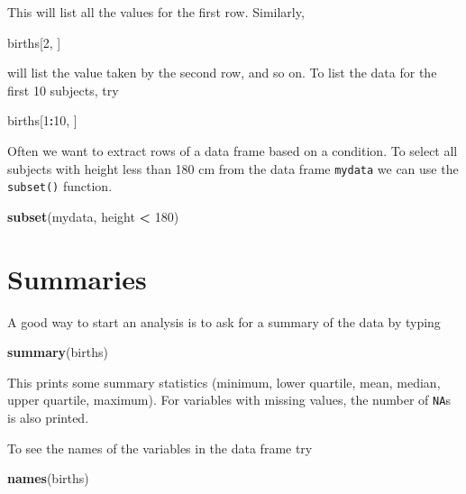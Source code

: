 \documentclass[
]{book}
\newenvironment{Shaded}{\begin{snugshade}}{\end{snugshade}}
\newcommand{\DecValTok}[1]{\textcolor[rgb]{0.00,0.00,0.81}{#1}}
\newcommand{\FunctionTok}[1]{\textcolor[rgb]{0.13,0.29,0.53}{\textbf{#1}}}
\newcommand{\NormalTok}[1]{#1}
\newcommand{\SpecialCharTok}[1]{\textcolor[rgb]{0.81,0.36,0.00}{\textbf{#1}}}
\begin{document}
This will list all the values for the first row. Similarly,

\begin{Shaded}
\begin{Highlighting}[]
\NormalTok{births[}\DecValTok{2}\NormalTok{, ]}
\end{Highlighting}
\end{Shaded}

will list the value taken by the second row, and so on.
To list the data for the first 10 subjects, try

\begin{Shaded}
\begin{Highlighting}[]
\NormalTok{births[}\DecValTok{1}\SpecialCharTok{:}\DecValTok{10}\NormalTok{, ]}
\end{Highlighting}
\end{Shaded}

Often we want to extract rows of a data frame based on a condition.
To select all subjects with height less than 180 cm from the
data frame \texttt{mydata} we can use the \texttt{subset()} function.

\begin{Shaded}
\begin{Highlighting}[]
\FunctionTok{subset}\NormalTok{(mydata, height }\SpecialCharTok{\textless{}} \DecValTok{180}\NormalTok{)}
\end{Highlighting}
\end{Shaded}

\section{Summaries}\label{summaries}

A good way to start an analysis is to ask for a
summary of the data by typing

\begin{Shaded}
\begin{Highlighting}[]
\FunctionTok{summary}\NormalTok{(births)}
\end{Highlighting}
\end{Shaded}

This prints some summary statistics (minimum, lower quartile, mean, median,
upper quartile, maximum). For variables with missing values, the number
of \texttt{NA}s is also printed.

To see the names of the variables in the data frame try

\begin{Shaded}
\begin{Highlighting}[]
\FunctionTok{names}\NormalTok{(births)}
\end{Highlighting}
\end{Shaded}
\end{document}
